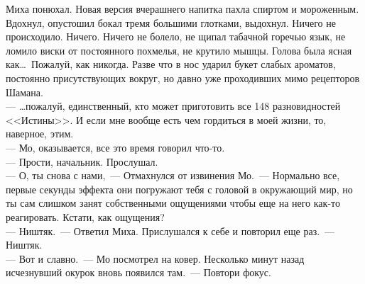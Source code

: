 Миха понюхал. Новая версия вчерашнего напитка пахла спиртом и мороженным. 
Вдохнул, опустошил бокал тремя большими глотками, выдохнул. Ничего не 
происходило. Ничего. Ничего не болело, не щипал табачной горечью язык, не 
ломило виски от постоянного похмелья, не крутило мышцы. Голова была ясная как\ldots\ 
Пожалуй, как никогда. Разве что в нос ударил букет слабых ароматов, постоянно 
присутствующих вокруг, но давно уже проходивших мимо рецепторов Шамана.\\
--- \ldots пожалуй, единственный, кто может приготовить все 148 разновидностей 
<<Истины>>. И если мне вообще есть чем гордиться в моей жизни, то, наверное, 
этим.\\ 
--- Мо, оказывается, все это время говорил что-то. \\
--- Прости, начальник. Прослушал. \\
--- О, ты снова с нами,~--- Отмахнулся от извинения Мо.~--- Нормально все, первые 
секунды эффекта они погружают тебя с головой в окружающий мир, но ты сам 
слишком занят собственными ощущениями чтобы еще на него как-то реагировать. Кстати, как 
ощущения?\\
--- Ништяк.~--- Ответил Миха. Прислушался к себе и повторил еще раз.~--- Ништяк.\\
--- Вот и славно.~--- Мо посмотрел на ковер. Несколько минут назад исчезнувший 
окурок вновь появился там.~--- Повтори фокус.

